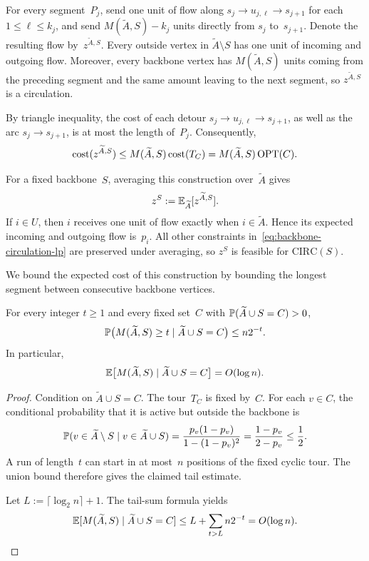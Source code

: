 \documentclass[12pt,a4paper,oneside]{report}
\begin{document}
For every segment~$P_j$, send one unit of flow along
$s_j\to u_{j,\ell}\to s_{j+1}$ for each $1\le\ell\le k_j$, and send
$M(\widetilde A,S)-k_j$ units directly from $s_j$ to~$s_{j+1}$.  Denote the
resulting flow by~$z^{\widetilde A,S}$.  Every outside vertex in
$\widetilde A\setminus S$ has one unit of
incoming and outgoing flow.  Moreover, every backbone vertex has
$M(\widetilde A,S)$ units coming from the preceding segment and the same
amount leaving to the next segment, so $z^{\widetilde A,S}$ is a circulation.

By triangle inequality, the cost of each detour
$s_j\to u_{j,\ell}\to s_{j+1}$, as well as the arc
$s_j\to s_{j+1}$, is at most the length of~$P_j$.  Consequently,
\begin{equation}\label{eq:realization-circulation-cost}
    \cost(z^{\widetilde A,S})
    \le M(\widetilde A,S)\cost(T_C)
    =M(\widetilde A,S)\opt(C).
\end{equation}

For a fixed backbone~$S$, averaging this construction over~$\widetilde A$
gives
\[
    z^S:=\E_{\widetilde A}[z^{\widetilde A,S}].
\]
If $i\in U$, then $i$ receives one unit of flow exactly when
$i\in\widetilde A$.
Hence its expected incoming and outgoing flow is~$p_i$.  All other
constraints in~\cref{eq:backbone-circulation-lp} are preserved under
averaging, so $z^S$ is feasible for $\mathrm{CIRC}(S)$.

We bound the expected cost of this construction by bounding the longest segment
between consecutive backbone vertices.

\begin{lemma}\label{lem:circulation-longest-run}
For every integer $t\ge1$ and every fixed set~$C$ with
$\P(\widetilde A\cup S=C)>0$,
\[
    \P\bigl(M(\widetilde A,S)\ge t\mid \widetilde A\cup S=C\bigr)
    \le n2^{-t}.
\]
In particular,
\[
    \E\bigl[M(\widetilde A,S)\mid \widetilde A\cup S=C\bigr]
    =O(\log n).
\]
\end{lemma}

\begin{proof}
Condition on $\widetilde A\cup S=C$.  The tour~$T_C$ is fixed by~$C$.  For each
$v\in C$, the conditional probability that it is active but outside the
backbone is
\[
    \P(v\in\widetilde A\setminus S\mid v\in\widetilde A\cup S)
    =
    \frac{p_v(1-p_v)}{1-(1-p_v)^2}
    =
    \frac{1-p_v}{2-p_v}
    \le\frac12.
\]
A run of length~$t$ can start in at most~$n$ positions of the
fixed cyclic tour.  The union bound therefore gives the
claimed tail estimate.

Let $L:=\lceil\log_2 n\rceil+1$.  The tail-sum formula yields
\[
    \E[M(\widetilde A,S)\mid \widetilde A\cup S=C]
    \le
    L+\sum_{t>L}n2^{-t}
    =O(\log n). \qedhere
\]
\end{proof}
\end{document}
